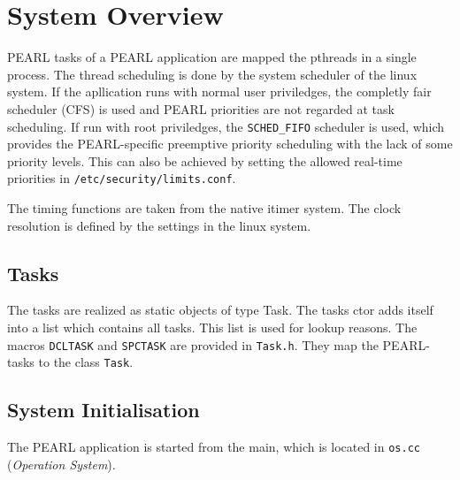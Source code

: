 \section{System Overview}

PEARL tasks of a PEARL application are mapped the pthreads in a single
process.  The thread scheduling is done by the system scheduler of the 
linux system. If the apllication runs with normal user priviledges, the
completly fair scheduler (CFS) is used and PEARL priorities are not
regarded at task scheduling. If run with root priviledges, the 
\texttt{SCHED\_FIFO} scheduler is used, which provides the 
PEARL-specific preemptive priority scheduling with the lack of some 
priority levels. This can also be achieved by setting the allowed
real-time priorities in \verb|/etc/security/limits.conf|.

The timing functions are taken from the native itimer system.
The clock resolution is defined by the settings in the linux system.

\subsection{Tasks}
The tasks are realized as static objects of type Task.
The tasks ctor adds itself into a list which contains all tasks.
This list is used for lookup reasons. 
The macros \texttt{DCLTASK} and \texttt{SPCTASK} are provided in 
\texttt{Task.h}. They map the PEARL-tasks to the class \texttt{Task}.

\subsection{System Initialisation}
The PEARL application is started from the main, which is located in 
\verb|os.cc| ({\em Operation System}).

